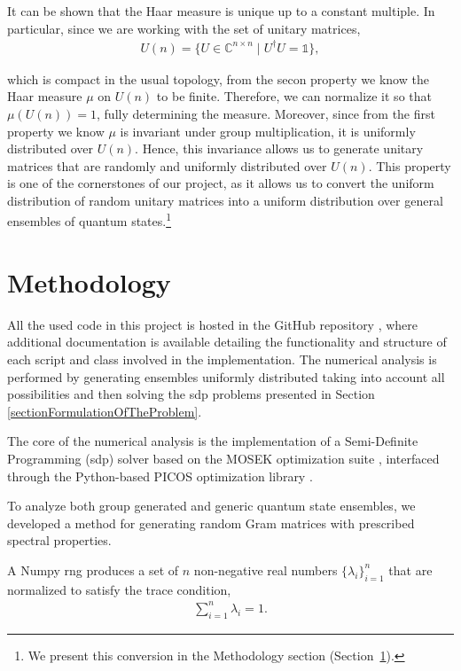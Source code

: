 \documentclass[12pt,letterpaper]{article}
\begin{document}
It can be shown that the Haar measure is unique up to a constant multiple. In particular, since we are working with the set of unitary matrices,
\begin{align*}
	U(n) = \{ U \in \mathbb{C}^{n \times n} \mid U^\dagger U = \mathds{1} \},
\end{align*}

which is compact in the usual topology, from the secon property we know the Haar measure $\mu$ on $U(n)$ to be finite. Therefore, we can normalize it so that $\mu(U(n)) = 1$, fully determining the measure. Moreover, since from the first property we know $\mu $ is invariant under group multiplication, it is uniformly distributed over $U(n)$. Hence, this invariance allows us to generate unitary matrices that are randomly and uniformly distributed over $U(n)$. This property is one of the cornerstones of our project, as it allows us to convert the uniform distribution of random unitary matrices into a uniform distribution over general ensembles of quantum states.\footnote{We present this conversion in the Methodology section (Section~\ref{sectionMethodology}).}
 
\newpage
\section{Methodology}\label{sectionMethodology}

\hspace{20pt}All the used code in this project is hosted in the GitHub repository \cite{GitHub}, where additional documentation is available detailing the functionality and structure of each script and class involved in the implementation. The numerical analysis is performed by generating ensembles uniformly distributed taking into account all possibilities and then solving the \gls{sdp} problems presented in Section \ref{sectionFormulationOfTheProblem}.

The core of the numerical analysis is the implementation of a Semi-Definite Programming (\gls{sdp}) solver based on the MOSEK optimization suite \cite{mosek_sdp}, interfaced through the Python-based PICOS optimization library \cite{PICOS}. 

To analyze both group generated and generic quantum state ensembles, we developed a method for generating random Gram matrices with prescribed spectral properties.

A Numpy \gls{rng}\cite{numpyRNG} produces a set of $n$ non-negative real numbers $\{\lambda_i\}_{i=1}^n$ that are normalized to satisfy the trace condition,
\begin{align*}
	\sum_{i=1}^n \lambda_i = 1.
\end{align*}
\end{document}
